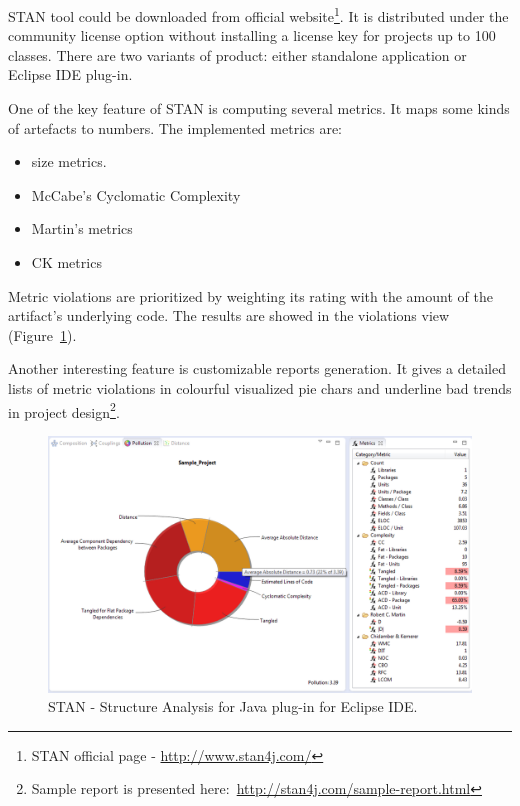 STAN tool could be downloaded from official website\footnote{STAN official page - \url{http://www.stan4j.com/}}. It is distributed under the community license option without installing a license key for projects up to 100 classes. There are two variants of product: either standalone application or Eclipse IDE plug-in.

One of the key feature of STAN is computing several metrics. It maps some kinds of artefacts to numbers. The implemented metrics are:

\begin{itemize}
\item size metrics.
\item McCabe's Cyclomatic Complexity
\item Martin's metrics
\item \ac{CK metrics}
\end{itemize}

Metric violations are prioritized  by weighting its rating with the amount of the artifact's underlying code. The results are showed in the violations view (Figure~\ref{fig:stan}).

Another interesting feature is customizable reports generation. It gives a detailed lists of metric violations in colourful visualized pie chars and underline bad trends in project design\footnote{Sample report is presented here:~\url{http://stan4j.com/sample-report.html}}\cite{stan}.

\begin{figure}[h!]
	\centering
	\includegraphics[scale=0.55]{img/stan.png} 
	\caption{STAN - Structure Analysis for Java plug-in for Eclipse IDE.}		
	\label{fig:stan}
\end{figure}

